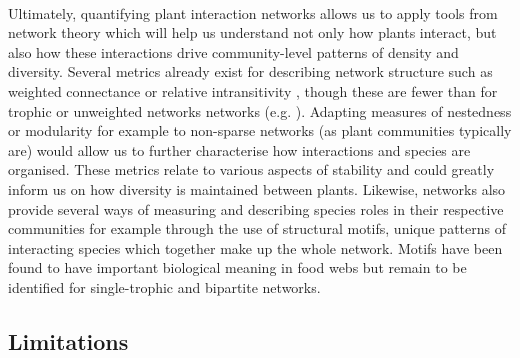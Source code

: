 \documentclass[a4,12pt]{article}
\begin{document}
        \paragraph{}
        Ultimately, quantifying plant interaction networks allows us to apply tools from network theory which will help us understand not only how plants interact, but also how these interactions drive community-level patterns of density and diversity. Several metrics already exist for describing network structure such as weighted connectance \parencite{Ulanowicz1991} or relative intransitivity \parencite{Laird2006a}, though these are fewer than for trophic or unweighted networks networks (e.g. \cite{Bersier2002, Delmas2019}). Adapting measures of nestedness or modularity for example to non-sparse networks (as plant communities typically are) would allow us to further characterise how interactions and species are organised. These metrics relate to various aspects of stability and could greatly inform us on how diversity is maintained between plants. Likewise, networks also provide several ways of measuring and describing species roles in their respective communities \parencite{Cirtwill2018a} for example through the use of structural motifs, unique patterns of interacting species which together make up the whole network. Motifs have been found to have important biological meaning in food webs \parencite{Bascompte2005a} but remain to be identified for single-trophic and bipartite networks. 

     


   \subsection{Limitations}
\end{document}
